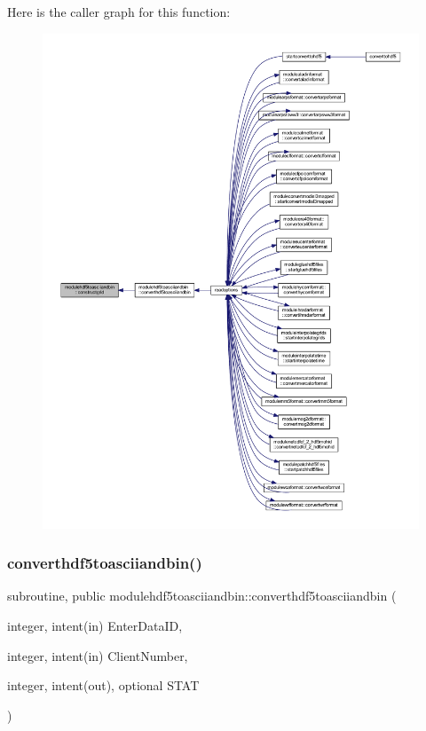 Here is the caller graph for this function\+:\nopagebreak
\begin{figure}[H]
\begin{center}
\leavevmode
\includegraphics[width=350pt]{namespacemodulehdf5toasciiandbin_aa5588d4c881fba9ebc04c57393f30c76_icgraph}
\end{center}
\end{figure}
\mbox{\label{namespacemodulehdf5toasciiandbin_a043d466c48df398adb80b3cb771a0b47}} 
\subsubsection{\texorpdfstring{converthdf5toasciiandbin()}{converthdf5toasciiandbin()}}
{\footnotesize\ttfamily subroutine, public modulehdf5toasciiandbin\+::converthdf5toasciiandbin (\begin{DoxyParamCaption}\item[{integer, intent(in)}]{Enter\+Data\+ID,  }\item[{integer, intent(in)}]{Client\+Number,  }\item[{integer, intent(out), optional}]{S\+T\+AT }\end{DoxyParamCaption})}

